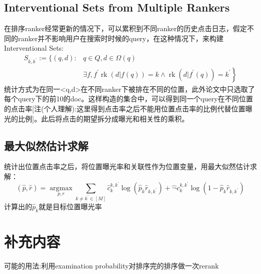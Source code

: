 \documentclass[UTF8]{ctexart}
\begin{document}
\subsection{Interventional Sets from Multiple Rankers}
在排序ranker经常更新的情况下，可以累积到不同ranker的历史点击日志，假定不同的ranker并不影响用户在搜索时时候的query，在这种情况下，来构建Interventional Sets:
\begin{equation}
\begin{aligned} S_{k, k^{\prime}}:=\{(q, d):& q \in Q, d \in \Omega(q) \\ &\left.\exists f, f^{\prime} \operatorname{rk}(d | f(q))=k \wedge \operatorname{rk}\left(d | f^{\prime}(q)\right)=k^{\prime}\right\} \end{aligned}
\end{equation}
统计方式为在同一<q,d>在不同ranker下被排在不同的位置，此外论文中只选取了每个query下的前10的doc。这样构造的集合中，可以得到同一个query在不同位置的点击率[注(个人理解):这里得到点击率之后不能用位置点击率的比例代替位置曝光的比例]。此后将点击的期望拆分成曝光和相关性的乘积。
\subsection{最大似然估计求解}
统计出位置点击率之后，将位置曝光率和关联性作为位置变量，用最大似然估计求解：
\begin{equation}
(\hat{p}, \hat{r})=\underset{p, r}{\operatorname{argmax}} \sum_{k \neq k^{\prime} \in[M]} \hat{c}_{k}^{k, k^{\prime}} \log \left(\hat{p}_{k} \hat{r}_{k, k^{\prime}}\right)+\hat{\neg} c_{k}^{k, k^{\prime}} \log \left(1-\hat{p}_{k} \hat{r}_{k, k^{\prime}}\right)
\end{equation}
计算出的$\hat{p}_{k}$就是目标位置曝光率
\section{补充内容}
可能的用法:利用examination probability对排序完的排序做一次rerank
\end{document}
